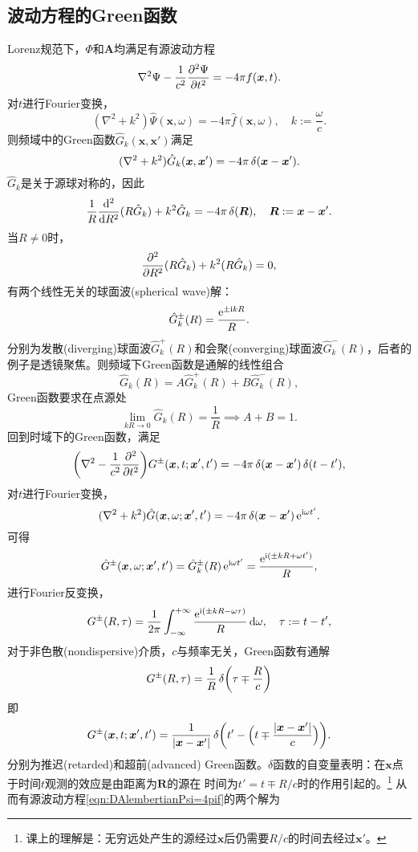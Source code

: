 \subsection{波动方程的Green函数}
Lorenz规范下，$\Phi$和$\bm A$均满足有源波动方程
\begin{equation}
    \label{eqn:DAlembertianPsi=4pif}
    \lapla\Psi-\frac1{c^2}\pv[2]\Psi t=-4\pi f(\bm x,t).
\end{equation}
对$t$进行Fourier变换，%
\[
    (\nabla^2+k^2)\hat\Psi(\bm x,\omega)=-4\pi\hat f(\bm x,\omega),\quad k:=\frac\omega c.
\]
则频域中的Green函数$\hat G_k(\bm x,\bm x')$满足
\[
    (\nabla^2+k^2)\hat G_k(\bm x,\bm x')=-4\pi\vd(\bm x-\bm x').
\]
$\hat G_k$是关于源球对称的，因此
\[
    \frac1R\dd[2]R(R\hat G_k)+k^2\hat G_k=-4\pi\vd(\bm R),\quad\bm R:=\bm x-\bm x'.
\]
当$R\neq 0$时， 
\[
    \pp[2]R(R\hat G_k)+k^2(R\hat G_k)=0,%
\]
有两个线性无关的球面波(spherical wave)解：
\[
    \hat G_k^\pm(R)=\frac{\e{\pm\i kR}}R.
\]
分别为发散(diverging)球面波$\hat G_k^+(R)$和会聚(converging)球面波$\hat G_k^-(R)$，后者的例子是透镜聚焦。则频域下Green函数是通解的线性组合
\[
    \hat G_k(R)=A\hat G_k^+(R)+B\hat G_k^-(R),
\]
Green函数要求在点源处
\[
    \lim_{kR\to0}\hat G_k(R)=\frac1R\implies A+B=1.
\]
回到时域下的Green函数，满足
\[
    \biggkh{\lapla-\frac1{c^2}\pp[2]t}G^\pm(\bm x,t;\bm x',t')=-4\pi\vd(\bm x-\bm x')\vd(t-t'),
\]
对$t$进行Fourier变换， 
\[
    (\lapla+k^2)\hat G(\bm x,\omega;\bm x',t')=-4\pi\vd(\bm x-\bm x')\e{\i\omega t'}.
\]
可得 
\[
    \hat G^\pm(\bm x,\omega;\bm x',t')=\hat G_k^\pm(R)\e{\i\omega t'}=\frac{\e{\i(\pm kR+\omega t')}}R,
\]
进行Fourier反变换，
\[
    G^\pm(R,\tau)=\frac1{2\pi}\int\iti\frac{\e{\i(\pm kR-\omega\tau)}}R\d\omega,\quad\tau:=t-t',
\]
对于非色散(nondispersive)介质，$c$与频率无关，Green函数有通解
\[
    G^\pm(R,\tau)=\frac1R\vd\biggkh{\tau\mp\frac Rc}
\]
即
\begin{equation}
    G^\pm(\bm x,t;\bm x',t')=\frac1{|\bm x-\bm x'|}\vd\biggkh{t'-\Bigkh{t\mp\frac{|\bm x-\bm x'|}c}}.
\end{equation}
分别为推迟(retarded)和超前(advanced) Green函数。$\delta$函数的自变量表明：在$\bm x$点于时间$t$观测的效应是由距离为$\bm R$的源在%
时间为$t'=t\mp R/c$时的作用引起的。\footnote{课上的理解是：无穷远处产生的源经过$\bm x$后仍需要$R/c$的时间去经过$\bm x'$。}
从而有源波动方程\eqref{eqn:DAlembertianPsi=4pif}的两个解为 
